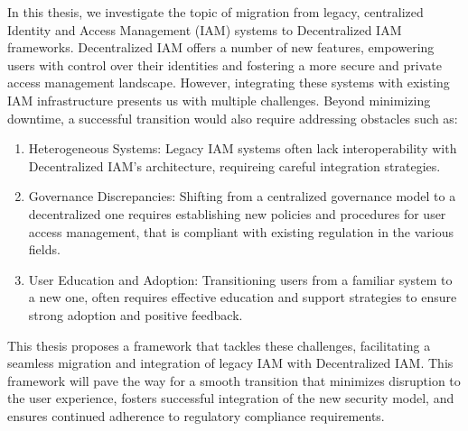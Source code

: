 
%

In this thesis, we investigate the topic of migration from legacy, centralized Identity and Access Management (IAM) 
systems to Decentralized IAM frameworks. 
Decentralized IAM offers a number of new features, empowering users with control over their identities and 
fostering a more secure and private access management landscape. 
However, integrating these systems with existing IAM infrastructure presents us with multiple challenges.
Beyond minimizing downtime, a successful transition would also require addressing obstacles such as:
\begin{enumerate}
  \item Heterogeneous Systems: Legacy IAM systems often lack interoperability with Decentralized IAM's 
  architecture, requireing careful integration strategies.
  \item Governance Discrepancies: Shifting from a centralized governance model to a decentralized one 
  requires establishing new policies and procedures for user access management, that is compliant with
  existing regulation in the various fields.
  \item User Education and Adoption: Transitioning users from a familiar system to a new one, often 
  requires effective education and support strategies to ensure strong adoption and positive feedback.
\end{enumerate}

This thesis proposes a framework that tackles these challenges, facilitating a seamless migration and integration 
of legacy IAM with Decentralized IAM. This framework will pave the way for a smooth transition that minimizes 
disruption to the user experience, fosters successful integration of the new security model, 
and ensures continued adherence to regulatory compliance requirements.

